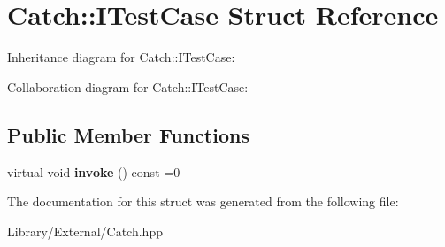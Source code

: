 \hypertarget{struct_catch_1_1_i_test_case}{}\section{Catch\+:\+:I\+Test\+Case Struct Reference}
\label{struct_catch_1_1_i_test_case}


Inheritance diagram for Catch\+:\+:I\+Test\+Case\+:


Collaboration diagram for Catch\+:\+:I\+Test\+Case\+:
\subsection*{Public Member Functions}
\begin{DoxyCompactItemize}
\item 
\hypertarget{struct_catch_1_1_i_test_case_a678825e62e7c17297621cfeb65588c34}{}virtual void {\bfseries invoke} () const =0\label{struct_catch_1_1_i_test_case_a678825e62e7c17297621cfeb65588c34}

\end{DoxyCompactItemize}


The documentation for this struct was generated from the following file\+:\begin{DoxyCompactItemize}
\item 
Library/\+External/Catch.\+hpp\end{DoxyCompactItemize}
